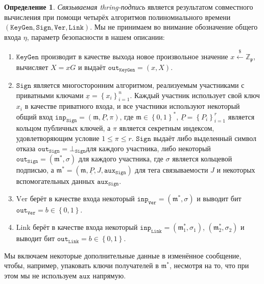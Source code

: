 \documentclass{mrl}
\theoremstyle{definition}
\numberwithin{theorem}{subsection}
\newtheorem{defn}[theorem]{Определение}
\newcommand{\scalarField}{\mathbb{Z}_{\mathfrak{p}}}
\newcommand{\m}{\mathfrak{m}}
\begin{document}
\begin{defn}
\textit{Связываемая thring-подпись} является результатом совместного вычисления при помощи четырёх алгоритмов полиномиального времени $(\texttt{KeyGen}, \texttt{Sign}, \texttt{Ver}, \texttt{Link})$. Мы не принимаем во внимание обозначение общего входа $\eta$, параметр безопасности в нашем описании:

\begin{enumerate}

\item $\texttt{KeyGen}$ производит в качестве выхода новое произвольное значение $x \overset{\$}{\leftarrow} \scalarField$, вычисляет $X = xG$ и выдаёт $\texttt{out}_{\texttt{KeyGen}} = (x,X)$.

\item $\texttt{Sign}$ является многосторонним алгоритмом, реализуемым участниками с приватными ключами $\underline{x} = \left\{x_i\right\}_{i=1}^{n}$. Каждый участник использует свой ключ $x_i$ в качестве приватного входа, и все участники используют некоторый общий вход $\texttt{inp}_{\texttt{Sign}} = (\m, \underline{P}, \pi)$, где $\m \in \left\{0,1\right\}^*$, $\underline{P} = \left\{P_i\right\}_{i=1}^{r}$ является кольцом публичных ключей, а $\pi$ является секретным индексом, удовлетворяющим условие $1 \leq \pi \leq r$. $\texttt{Sign}$ выдаёт либо выделенный символ отказа $\texttt{out}_{\texttt{Sign}} = \bot_{\texttt{Sign}}$для каждого участника, либо некоторый $\texttt{out}_{\texttt{Sign}} = (\m^*, \sigma)$ для каждого участника, где $\sigma$ является кольцевой подписью, а $\m^* = (\m, \underline{P}, J, \texttt{aux}_{\texttt{Sign}})$ для тега связываемости $J$ и некоторых вспомогательных данных $\texttt{aux}_{\texttt{Sign}}$.

\item $\text{Ver}$ берёт в качестве входа некоторый $\texttt{inp}_{\texttt{Ver}} = (\m^*, \sigma)$ и выводит бит $\texttt{out}_{\texttt{Ver}} = b \in \left\{0,1\right\}$. %

\item $\text{Link}$ берёт в качестве входа некоторый $\texttt{inp}_{\texttt{Link}} = (\m_1^*, \sigma_1)$, $(\m_2^*, \sigma_2)$ и выводит бит $\texttt{out}_{\texttt{Link}} = b \in \left\{0,1\right\}$.

\end{enumerate}
\end{defn} Мы включаем некоторые дополнительные данные в изменённое сообщение, чтобы, например, упаковать ключи получателей в $\m^*$, несмотря на то, что при этом мы не используем $\texttt{aux}$ напрямую.
\end{document}
